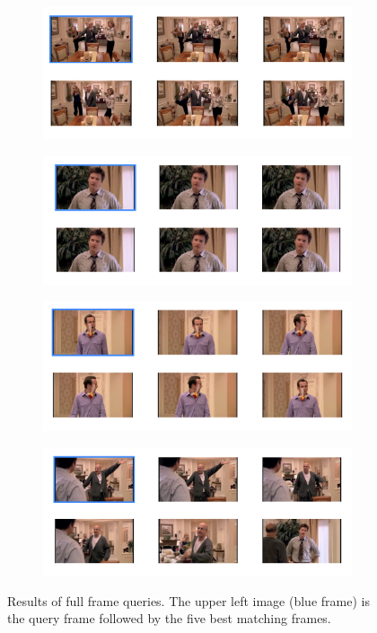\documentclass{paper}
\begin{document}
\begin{figure}[h!]
    \centering
    \begin{subfigure}[]{\textwidth}
        \centering
        \includegraphics[width=\textwidth]{query1.png}
    \end{subfigure}
    \begin{subfigure}[]{\textwidth}
        \centering
        \includegraphics[width=\textwidth]{query6.png}
    \end{subfigure}
    \begin{subfigure}[]{\textwidth}
        \centering
        \includegraphics[width=\textwidth]{query3.png}
    \end{subfigure}
    \begin{subfigure}[]{\textwidth}
        \centering
        \includegraphics[width=\textwidth]{query5.png}
    \end{subfigure}
    \caption{Results of full frame queries. The upper left image (blue frame) is the query frame followed by the five best matching frames. }
\label{fig:fullfFame}
\end{figure}
\end{document}
